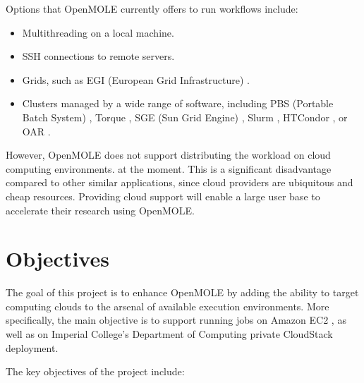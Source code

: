 Options that OpenMOLE currently offers to run workflows include:

\begin{itemize}
	\item Multithreading on a local machine.
	\item SSH connections to remote servers.
	\item Grids, such as EGI (European Grid Infrastructure) \cite{EGI}.
	\item Clusters managed by a wide range of software, including PBS (Portable Batch System) \cite{PBS}, Torque \cite{Torque}, SGE (Sun Grid Engine) \cite{SGE}, Slurm \cite{SLURM}, HTCondor \cite{HTCondor}, or OAR \cite{OAR}.
\end{itemize}

However, OpenMOLE does not support distributing the workload on cloud computing environments. at the moment. This is a significant disadvantage compared to other similar applications, since cloud providers are ubiquitous and cheap resources. Providing cloud support will enable a large user base to accelerate their research using OpenMOLE.

\section{Objectives}

The goal of this project is to enhance OpenMOLE by adding the ability to target computing clouds to the arsenal of available execution environments. More specifically, the main objective is to support running jobs on Amazon EC2 \cite{EC2}, as well as on Imperial College's Department of Computing private CloudStack deployment.


The key objectives of the project include:

